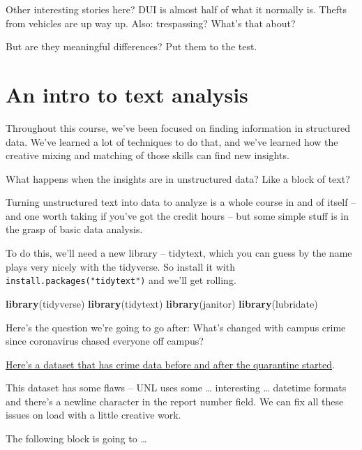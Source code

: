 \documentclass[]{book}
\newenvironment{Shaded}{\begin{snugshade}}{\end{snugshade}}
\newcommand{\KeywordTok}[1]{\textcolor[rgb]{0.13,0.29,0.53}{\textbf{#1}}}
\newcommand{\NormalTok}[1]{#1}
\begin{document}
Other interesting stories here? DUI is almost half of what it normally is. Thefts from vehicles are up way up. Also: trespassing? What's that about?

But are they meaningful differences? Put them to the test.

\hypertarget{an-intro-to-text-analysis}{%
\chapter{An intro to text analysis}\label{an-intro-to-text-analysis}}

Throughout this course, we've been focused on finding information in structured data. We've learned a lot of techniques to do that, and we've learned how the creative mixing and matching of those skills can find new insights.

What happens when the insights are in unstructured data? Like a block of text?

Turning unstructured text into data to analyze is a whole course in and of itself -- and one worth taking if you've got the credit hours -- but some simple stuff is in the grasp of basic data analysis.

To do this, we'll need a new library -- tidytext, which you can guess by the name plays very nicely with the tidyverse. So install it with \texttt{install.packages("tidytext")} and we'll get rolling.

\begin{Shaded}
\begin{Highlighting}[]
\KeywordTok{library}\NormalTok{(tidyverse)}
\KeywordTok{library}\NormalTok{(tidytext)}
\KeywordTok{library}\NormalTok{(janitor)}
\KeywordTok{library}\NormalTok{(lubridate)}
\end{Highlighting}
\end{Shaded}

Here's the question we're going to go after: What's changed with campus crime since coronavirus chased everyone off campus?

\href{https://unl.box.com/s/1reagysljshlxgvhs92bcj7xid1o50ll}{Here's a dataset that has crime data before and after the quarantine started}.

This dataset has some flaws -- UNL uses some \ldots{} interesting \ldots{} datetime formats and there's a newline character in the report number field. We can fix all these issues on load with a little creative work.

The following block is going to \ldots{}
\end{document}
